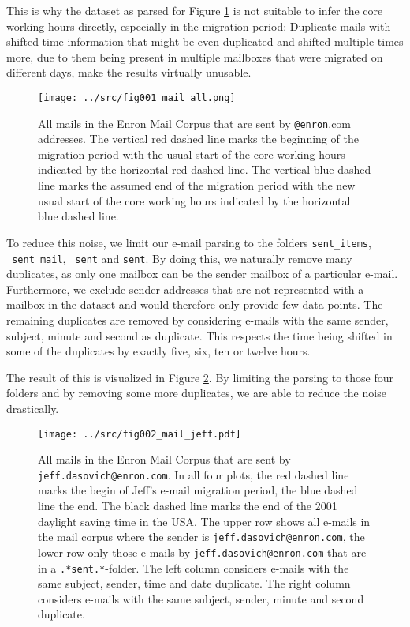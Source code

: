 \documentclass{article}
\begin{document}
This is why the dataset as parsed for Figure \ref{fig:allmail} is not suitable
to infer the core working hours directly, especially in the migration period:
Duplicate mails with shifted time information that might be even duplicated and
shifted multiple times more, due to them being present in multiple mailboxes
that were migrated on different days, make the results virtually unusable.

\begin{figure}
  \centering
  \texttt{[image: ../src/fig001\_mail\_all.png]}
   \caption{All mails in the Enron Mail Corpus that are sent by
  \texttt{@enron}.com addresses. The vertical red dashed line marks the beginning of
  the migration period with the usual start of the core working hours indicated
  by the horizontal red dashed line. The vertical blue dashed line marks the
  assumed end of the migration period with the new usual start of the core
  working hours indicated by the horizontal blue dashed line.}
  \label{fig:allmail}
\end{figure}

To reduce this noise, we limit our e-mail parsing to the folders
\texttt{sent\_items}, \texttt{\_sent\_mail}, \texttt{\_sent} and \texttt{sent}.
By doing this, we naturally remove many duplicates, as only one mailbox can be
the sender mailbox of a particular e-mail. Furthermore, we exclude sender
addresses that are not represented with a mailbox in the dataset and would
therefore only provide few data points. The remaining duplicates are removed by
considering e-mails with the same sender, subject, minute and second as
duplicate. This respects the time being shifted in some of the duplicates by
exactly five, six, ten or twelve hours.

The result of this is visualized in Figure \ref{fig:jeffmail}. By limiting the
parsing to those four folders and by removing some more duplicates, we are able
to reduce the noise drastically.

\begin{figure}
  \centering
  \texttt{[image: ../src/fig002\_mail\_jeff.pdf]}
  \label{fig:jeffmail}
  \caption{All mails in the Enron Mail Corpus that are sent by
  \texttt{jeff.dasovich@enron.com}. In all four plots, the red dashed line marks
  the begin of Jeff's e-mail migration period, the blue dashed line the end. The
  black dashed line marks the end of the 2001 daylight saving time in the USA.
  The upper row shows all e-mails in the mail corpus where the sender is
  \texttt{jeff.dasovich@enron.com}, the lower row only those e-mails by
  \texttt{jeff.dasovich@enron.com} that are in a \texttt{.*sent.*}-folder. The
  left column considers e-mails with the same subject, sender, time and date
  duplicate. The right column considers e-mails with the same subject, sender,
  minute and second duplicate.}
\end{figure}
\end{document}
